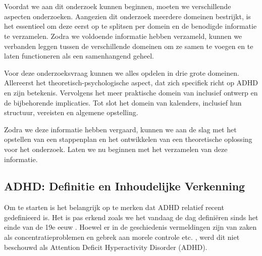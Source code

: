 \chapter{}%
\label{ch:stand-van-zaken}



Voordat we aan dit onderzoek kunnen beginnen, moeten we verschillende aspecten onderzoeken. Aangezien dit onderzoek meerdere domeinen bestrijkt, is het essentieel om deze eerst op te splitsen per domein en de benodigde informatie te verzamelen. Zodra we voldoende informatie hebben verzameld, kunnen we verbanden leggen tussen de verschillende domeinen om ze samen te voegen en te laten functioneren als een samenhangend geheel. \newline

Voor deze onderzoeksvraag kunnen we alles opdelen in drie grote domeinen. Allereerst het theoretisch-psychologische aspect, dat zich specifiek richt op ADHD en zijn betekenis. Vervolgens het meer praktische domein van inclusief ontwerp en de bijbehorende implicaties. Tot slot het domein van kalenders, inclusief hun structuur, vereisten en algemene opstelling. \newline

Zodra we deze informatie hebben vergaard, kunnen we aan de slag met het opstellen van een stappenplan en het ontwikkelen van een theoretische oplossing voor het onderzoek. Laten we nu beginnen met het verzamelen van deze informatie.


\section{ADHD: Definitie en Inhoudelijke Verkenning}

Om te starten is het belangrijk op te merken dat ADHD relatief recent gedefinieerd is. Het is pas erkend zoals we het vandaag de dag definiëren sinds het einde van de 19e eeuw \autocite{lange2010history}. Hoewel er in de geschiedenis vermeldingen zijn van zaken als concentratieproblemen en gebrek aan morele controle etc. \autocite{lange2010history}, werd dit niet beschouwd als Attention Deficit Hyperactivity Disorder (ADHD).\newline

